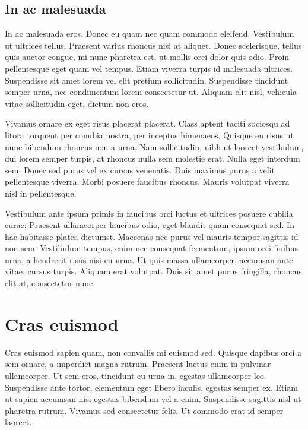 \documentclass[sigconf]{acmart}
\begin{document}
\subsection{In ac malesuada}
In ac malesuada eros. Donec eu quam nec quam commodo eleifend. Vestibulum ut ultrices tellus. Praesent varius rhoncus nisi at aliquet. Donec scelerisque, tellus quis auctor congue, mi nunc pharetra est, ut mollis orci dolor quis odio. Proin pellentesque eget quam vel tempus. Etiam viverra turpis id malesuada ultrices. Suspendisse sit amet lorem vel elit pretium sollicitudin. Suspendisse tincidunt semper urna, nec condimentum lorem consectetur ut. Aliquam elit nisl, vehicula vitae sollicitudin eget, dictum non eros.\cite{openssl-documentation}

Vivamus ornare ex eget risus placerat placerat. Class aptent taciti sociosqu ad litora torquent per conubia nostra, per inceptos himenaeos. Quisque eu risus ut nunc bibendum rhoncus non a urna. Nam sollicitudin, nibh ut laoreet vestibulum, dui lorem semper turpis, at rhoncus nulla sem molestie erat. Nulla eget interdum sem. Donec sed purus vel ex cursus venenatis. Duis maximus purus a velit pellentesque viverra. Morbi posuere faucibus rhoncus. Mauris volutpat viverra nisl in pellentesque.\cite{arstechnica-article}\cite{cryptoeprint:2022/975}

Vestibulum ante ipsum primis in faucibus orci luctus et ultrices posuere cubilia curae; Praesent ullamcorper faucibus odio, eget blandit quam consequat sed. In hac habitasse platea dictumst. Maecenas nec purus vel mauris tempor sagittis id non sem. Vestibulum tempus, enim nec consequat fermentum, ipsum orci finibus urna, a hendrerit risus nisi eu urna. Ut quis massa ullamcorper, accumsan ante vitae, cursus turpis. Aliquam erat volutpat. Duis sit amet purus fringilla, rhoncus elit at, consectetur nunc.\cite{pqc-standardization}

\section{Cras euismod}
Cras euismod sapien quam, non convallis mi euismod sed. Quisque dapibus orci a sem ornare, a imperdiet magna rutrum. Praesent luctus enim in pulvinar ullamcorper. Ut sem eros, tincidunt eu urna in, egestas ullamcorper leo. Suspendisse ante tortor, elementum eget libero iaculis, egestas semper ex. Etiam ut sapien accumsan nisi egestas bibendum vel a enim. Suspendisse sagittis nisl ut pharetra rutrum. Vivamus sed consectetur felis. Ut commodo erat id semper laoreet.\cite{cryptoeprint:2022/1225}
\end{document}
